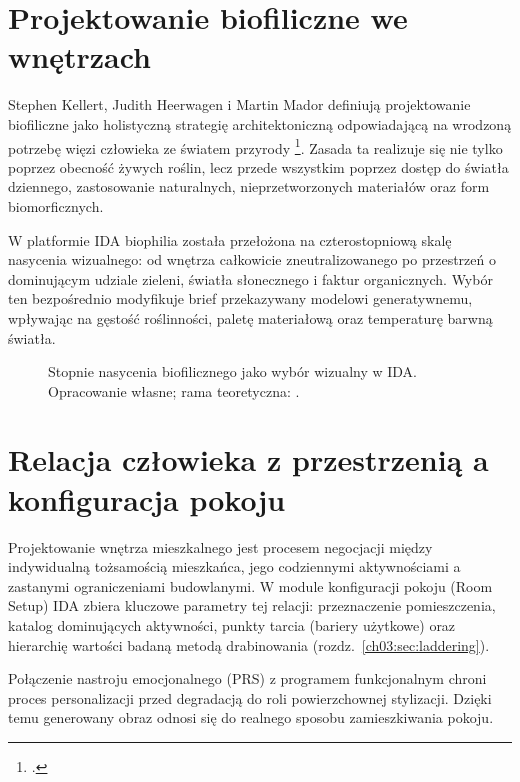 \section{Projektowanie biofiliczne we wnętrzach}
\label{ch02:sec:biophilia}

Stephen Kellert, Judith Heerwagen i Martin Mador definiują projektowanie biofiliczne jako holistyczną strategię architektoniczną odpowiadającą na wrodzoną potrzebę więzi człowieka ze światem przyrody \footcite{kellert2008biophilic}. Zasada ta realizuje się nie tylko poprzez obecność żywych roślin, lecz przede wszystkim poprzez dostęp do światła dziennego, zastosowanie naturalnych, nieprzetworzonych materiałów oraz form biomorficznych.

W platformie IDA biophilia została przełożona na czterostopniową skalę nasycenia wizualnego: od wnętrza całkowicie zneutralizowanego po przestrzeń o dominującym udziale zieleni, światła słonecznego i faktur organicznych.
Wybór ten bezpośrednio modyfikuje brief przekazywany modelowi generatywnemu, wpływając na gęstość roślinności, paletę materiałową oraz temperaturę barwną światła.

\begin{figure}[htbp]
  \centering
  \caption[Stopnie nasycenia biofilicznego jako wybór wizualny w IDA. Opracowanie własne; rama teoretyczna: Kellert, Heerwagen i Mador.]{Stopnie nasycenia biofilicznego jako wybór wizualny w IDA.
    Opracowanie własne; rama teoretyczna: \textcite{kellert2008biophilic}.}
  \label{fig:ch02:biophilia}
\end{figure}

\section{Relacja człowieka z przestrzenią a konfiguracja pokoju}
\label{ch02:sec:peo}

Projektowanie wnętrza mieszkalnego jest procesem negocjacji między indywidualną tożsamością mieszkańca, jego codziennymi aktywnościami a zastanymi ograniczeniami budowlanymi.
W module konfiguracji pokoju (Room Setup) IDA zbiera kluczowe parametry tej relacji: przeznaczenie pomieszczenia, katalog dominujących aktywności, punkty tarcia (bariery użytkowe) oraz hierarchię wartości badaną metodą drabinowania (rozdz.~\ref{ch03:sec:laddering}).

Połączenie nastroju emocjonalnego (PRS) z programem funkcjonalnym chroni proces personalizacji przed degradacją do roli powierzchownej stylizacji. Dzięki temu generowany obraz odnosi się do realnego sposobu zamieszkiwania pokoju.

